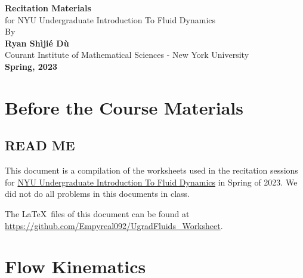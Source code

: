 \documentclass[11pt,letterpaper]{report}
\begin{document}
\begin{titlepage}
    \begin{center}
        \vspace*{4cm}
        \Huge
        \textbf{Recitation Materials} \\
        \vspace{0.5cm}
        \LARGE
        {for NYU Undergraduate Introduction To Fluid Dynamics}\\
        \vspace{3cm}
        By\\
        \vspace{0.5cm}
        \textbf{Ryan Sh\`iji\'e D\`u}\\
        \vspace{0.2cm}
        \normalsize
        {Courant Institute of Mathematical Sciences - New York University}\\
        \vspace{2cm}
        \Large
        \textbf{Spring, 2023}
        
    \end{center}
\end{titlepage}

\setcounter{tocdepth}{1}
\tableofcontents

\setcounter{chapter}{-1}
\chapter{Before the Course Materials}
\section{READ ME}
This document is a compilation of the worksheets used in the recitation sessions for \href{https://math.nyu.edu/dynamic/courses/undergrad/math-ua-230/}{NYU Undergraduate Introduction To Fluid Dynamics} in Spring of 2023. We did not do all problems in this documents in class.

The \LaTeX\ files of this document can be found at \url{https://github.com/Empyreal092/UgradFluids_Worksheet}.


\chapter{Flow Kinematics}
\end{document}
